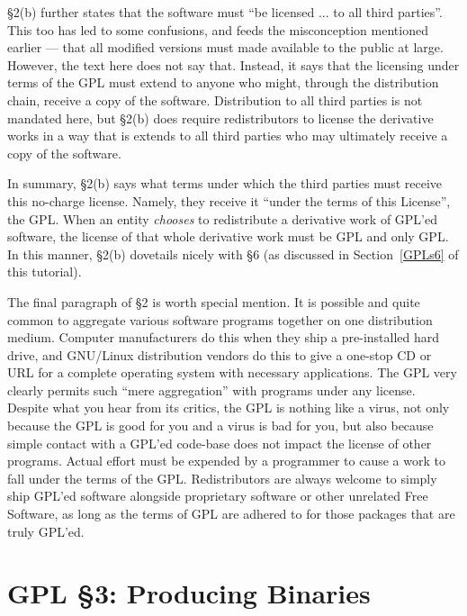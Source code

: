 \documentclass[12pt]{report}
\begin{document}
\S 2(b) further states that the software must ``be licensed ... to all
third parties''.  This too has led to some confusions, and feeds the
misconception mentioned earlier --- that all modified versions must made
available to the public at large.  However, the text here does not say
that.  Instead, it says that the licensing under terms of the GPL must
extend to anyone who might, through the distribution chain, receive a copy
of the software.  Distribution to all third parties is not mandated here,
but \S 2(b) does require redistributors to license the derivative works in
a way that is extends to all third parties who may ultimately receive a
copy of the software.

In summary, \S 2(b) says what terms under which the third parties must
receive this no-charge license.  Namely, they receive it ``under the terms
of this License'', the GPL.  When an entity \emph{chooses} to redistribute
a derivative work of GPL'ed software, the license of that whole derivative
work must be GPL and only GPL\@.  In this manner, \S 2(b) dovetails nicely
with \S 6 (as discussed in Section~\ref{GPLs6} of this tutorial).

\medskip

The final paragraph of \S 2 is worth special mention.  It is possible and
quite common to aggregate various software programs together on one
distribution medium.  Computer manufacturers do this when they ship a
pre-installed hard drive, and GNU/Linux distribution vendors do this to
give a one-stop CD or URL for a complete operating system with necessary
applications.  The GPL very clearly permits such ``mere aggregation'' with
programs under any license.  Despite what you hear from its critics, the
GPL is nothing like a virus, not only because the GPL is good for you and
a virus is bad for you, but also because simple contact with a GPL'ed
code-base does not impact the license of other programs.  Actual effort
must be expended by a programmer to cause a work to fall under the terms
of the GPL.  Redistributors are always welcome to simply ship GPL'ed
software alongside proprietary software or other unrelated Free Software,
as long as the terms of GPL are adhered to for those packages that are
truly GPL'ed.

\section{GPL \S 3: Producing Binaries}

\end{document}
